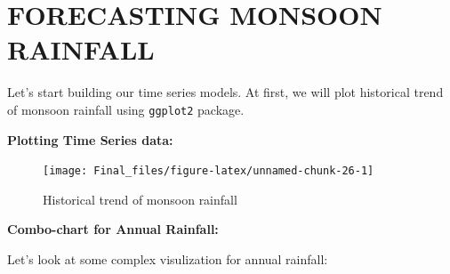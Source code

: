 \documentclass[12pt,openany]{book}
\newenvironment{Shaded}{\begin{snugshade}}{\end{snugshade}}
\newcommand{\DataTypeTok}[1]{\textcolor[rgb]{0.13,0.29,0.53}{#1}}
\newcommand{\DecValTok}[1]{\textcolor[rgb]{0.00,0.00,0.81}{#1}}
\newcommand{\FloatTok}[1]{\textcolor[rgb]{0.00,0.00,0.81}{#1}}
\newcommand{\KeywordTok}[1]{\textcolor[rgb]{0.13,0.29,0.53}{\textbf{#1}}}
\newcommand{\NormalTok}[1]{#1}
\newcommand{\OperatorTok}[1]{\textcolor[rgb]{0.81,0.36,0.00}{\textbf{#1}}}
\newcommand{\StringTok}[1]{\textcolor[rgb]{0.31,0.60,0.02}{#1}}
\begin{document}
\hypertarget{forecasting-monsoon-rainfall}{%
\chapter{FORECASTING MONSOON RAINFALL}\label{forecasting-monsoon-rainfall}}

Let's start building our time series models. At first, we will plot historical trend of monsoon rainfall using \texttt{ggplot2} package.

\textbf{Plotting Time Series data:}

\begin{Shaded}
\end{Shaded}

\begin{figure}

{\centering \texttt{[image: Final\_files/figure-latex/unnamed-chunk-26-1]} 

}

\caption{Historical trend of monsoon rainfall}\label{fig:unnamed-chunk-26}
\end{figure}

\textbf{Combo-chart for Annual Rainfall:}

Let's look at some complex visulization for annual rainfall:
\end{document}
